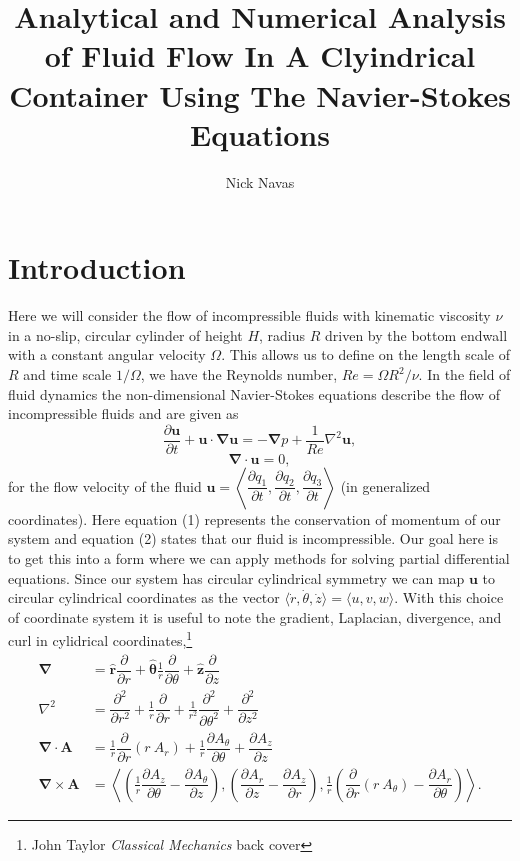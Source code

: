 \documentclass[11pt,letterpaper]{article}
\title{Analytical and Numerical Analysis of Fluid Flow In A Clyindrical Container Using The Navier-Stokes Equations}
\author{Nick Navas}
\newcommand{\fdel}[2]{\dfrac{\partial{#1}}{\partial {#2}}} %
\newcommand{\sdel}[2]{\dfrac{\partial^2{#1}}{\partial{#2}^2}} %
\newcommand{\fpar}[1]{\left({#1}\right)} %
\newcommand{\unit}[1]{\hat{\mathbf{#1}}} %
\newcommand{\del}{\pmb{\nabla}} %
\begin{document}
\maketitle

\section{Introduction}
Here we will consider the flow of incompressible fluids with kinematic viscosity $\nu$ in a no-slip, circular cylinder of height $H$, radius $R$ driven by the bottom endwall with a constant angular velocity $\Omega$. This allows us to define on the length scale of $R$ and time scale $1/\Omega$, we have the Reynolds number, $Re = \Omega R^2 / \nu$. In the field of fluid dynamics the non-dimensional Navier-Stokes equations describe the flow of incompressible fluids and are given as
\begin{equation}
    \fdel{\mathbf{u}}{t} + \mathbf{u} \cdot \del\mathbf{u} = -\del p + \dfrac{1}{Re}\nabla^2\mathbf{u},
\end{equation}
\begin{equation}
    \del \cdot \mathbf{u} = 0,
\end{equation}
for the flow velocity of the fluid $\mathbf{u} = \left\langle \fdel{q_1}{t},\fdel{q_2}{t},\fdel{q_3}{t} \right\rangle$ (in generalized coordinates). Here equation (1) represents the conservation of momentum of our system and equation (2) states that our fluid is incompressible. Our goal here is to get this into a form where we can apply methods for solving partial differential equations. Since our system has circular cylindrical symmetry we can map $\mathbf{u}$ to circular cylindrical coordinates as the vector $\langle{\dot{r},\dot{\theta},\dot{z}\rangle} = \langle{u,v,w\rangle}$. With this choice of coordinate system it is useful to note the gradient, Laplacian, divergence, and curl in cylidrical coordinates,\footnote{John Taylor \emph{Classical Mechanics} back cover}
\begin{align}
    \del  &= \unit{r}\fdel{}{r} + \pmb{\hat{\theta}}\frac{1}{r} \fdel{}{\theta}+\unit{z}\fdel{}{z}\\
    \nabla^2 &= \sdel{}{r}+\frac{1}{r}\fdel{}{r}+\frac{1}{r^2}\sdel{}{\theta}+\sdel{}{z}\\
    \del\cdot\mathbf{A} &= \frac{1}{r}\fdel{}{r}(r\ A_r)+\frac{1}{r}\fdel{A_\theta}{\theta}+\fdel{A_z}{z}\\
    \del \times \mathbf{A} &= \left\langle\fpar{\frac{1}{r}\fdel{A_z}{\theta} - \fdel{A_\theta}{z}},\fpar{\fdel{A_r}{z} - \fdel{A_z}{r}},\frac{1}{r}\fpar{\fdel{}{r}\fpar{r\ A_\theta} - \fdel{A_r}{\theta}}\right\rangle.
\end{align} 
\end{document}
